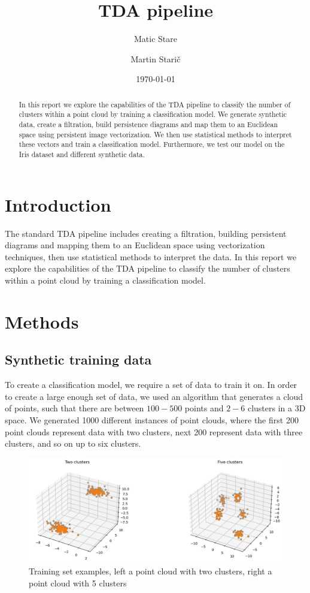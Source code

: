 \documentclass{article}
\title{TDA pipeline}
\author{
  Matic Stare
  \and
  Martin Starič
}
\date{\today}
\begin{document}
\maketitle

\tableofcontents
\newpage

\begin{abstract}
    In this report we explore the capabilities of the TDA pipeline to classify the number of clusters within a point cloud by training a classification model. We generate synthetic data, create a filtration, build persistence diagrams and map them to an Euclidean space using persistent image vectorization. We then use statistical methods to interpret these vectors and train a classification model. Furthermore, we test our model on the Iris dataset and different synthetic data.
\end{abstract}

\section{Introduction}
The standard TDA pipeline includes creating a filtration, building persistent diagrams and mapping them to an Euclidean space using vectorization techniques, then use statistical methods to interpret the data. In this report we explore the capabilities of the TDA pipeline to classify the number of clusters within a point cloud by training a classification model.


\section{Methods}
\subsection{Synthetic training data}
To create a classification model, we require a set of data to train it on. In order to create a large enough set of data, we used an algorithm that generates a cloud of points, such that there are between $100-500$ points and $2-6$ clusters in a 3D space. We generated 1000 different instances of point clouds, where the first 200 point clouds represent data with two clusters, next 200 represent data with three clusters, and so on up to six clusters.

\begin{figure}[H]
    \centering
    \includegraphics[width=1\linewidth]{TrainingDataViz.png}
    \caption{Training set examples, left a point cloud with two clusters, right a point cloud with 5 clusters}
\end{figure}
\end{document}
